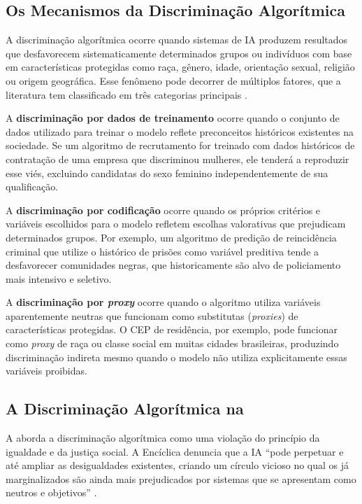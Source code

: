 \subsection{Os Mecanismos da Discriminação Algorítmica}
\label{subsec:mecanismos-discriminacao}

A discriminação algorítmica ocorre quando sistemas de IA produzem resultados que desfavorecem sistematicamente determinados grupos ou indivíduos com base em características protegidas como raça, gênero, idade, orientação sexual, religião ou origem geográfica. Esse fenômeno pode decorrer de múltiplos fatores, que a literatura tem classificado em três categorias principais \cite{Noble2018AFS, Barocas2016BFF}.

A \textbf{discriminação por dados de treinamento} ocorre quando o conjunto de dados utilizado para treinar o modelo reflete preconceitos históricos existentes na sociedade. Se um algoritmo de recrutamento for treinado com dados históricos de contratação de uma empresa que discriminou mulheres, ele tenderá a reproduzir esse viés, excluindo candidatas do sexo feminino independentemente de sua qualificação.

A \textbf{discriminação por codificação} ocorre quando os próprios critérios e variáveis escolhidos para o modelo refletem escolhas valorativas que prejudicam determinados grupos. Por exemplo, um algoritmo de predição de reincidência criminal que utilize o histórico de prisões como variável preditiva tende a desfavorecer comunidades negras, que historicamente são alvo de policiamento mais intensivo e seletivo.

A \textbf{discriminação por \textit{proxy}} ocorre quando o algoritmo utiliza variáveis aparentemente neutras que funcionam como substitutas (\textit{proxies}) de características protegidas. O CEP de residência, por exemplo, pode funcionar como \textit{proxy} de raça ou classe social em muitas cidades brasileiras, produzindo discriminação indireta mesmo quando o modelo não utiliza explicitamente essas variáveis proibidas.

\subsection{A Discriminação Algorítmica na \MH{}}
\label{subsec:discriminacao-mh}

A \MH{} aborda a discriminação algorítmica como uma violação do princípio da igualdade e da justiça social. A Encíclica denuncia que a IA ``pode perpetuar e até ampliar as desigualdades existentes, criando um círculo vicioso no qual os já marginalizados são ainda mais prejudicados por sistemas que se apresentam como neutros e objetivos'' \cite{LeaoXIV2026MH}.

